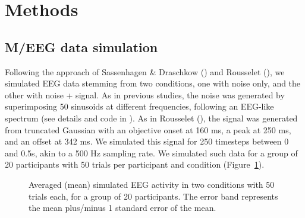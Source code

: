 \documentclass[
  doc,
  floatsintext,
  longtable,
  a4paper,
  nolmodern,
  notxfonts,
  notimes,
  colorlinks=true,linkcolor=blue,citecolor=blue,urlcolor=blue]{apa7}
\begin{document}
\section{Methods}\label{methods}

\subsection{M/EEG data simulation}\label{meeg-data-simulation}

Following the approach of Sassenhagen \& Draschkow
() and Rousselet
(), we simulated EEG data
stemming from two conditions, one with noise only, and the other with
noise + signal. As in previous studies, the noise was generated by
superimposing 50 sinusoids at different frequencies, following an
EEG-like spectrum (see details and code in
). As in Rousselet
(), the signal was generated
from truncated Gaussian with an objective onset at 160 ms, a peak at 250
ms, and an offset at 342 ms. We simulated this signal for 250 timesteps
between 0 and 0.5s, akin to a 500 Hz sampling rate. We simulated such
data for a group of 20 participants with 50 trials per participant and
condition (Figure~\ref{fig-eeg}).

\begin{figure}[!htb]

\caption{\label{fig-eeg}Averaged (mean) simulated EEG activity in two
conditions with 50 trials each, for a group of 20 participants. The
error band represents the mean plus/minus 1 standard error of the mean.}


\end{figure}%
\end{document}

